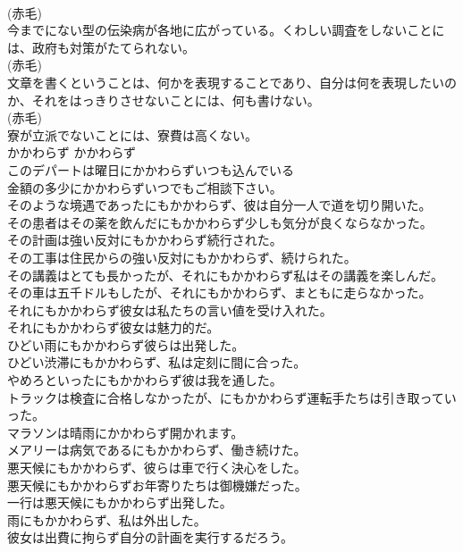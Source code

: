 \documentclass[8pt]{extreport}
\begin{document}
\begin{CJK}{UTF8}{min}
\\	(赤毛)
\\	今までにない型の伝染病が各地に広がっている。くわしい調査をしないことには、政府も対策がたてられない。  
\\	(赤毛)
\\	文章を書くということは、何かを表現することであり、自分は何を表現したいのか、それをはっきりさせないことには、何も書けない。  
\\	(赤毛)
\\	寮が立派でないことには、寮費は高くない。  
\\	かかわらず	かかわらず	
\\	このデパートは曜日にかかわらずいつも込んでいる  
\\	金額の多少にかかわらずいつでもご相談下さい。  
\\	そのような境遇であったにもかかわらず、彼は自分一人で道を切り開いた。   
\\	その患者はその薬を飲んだにもかかわらず少しも気分が良くならなかった。   
\\	その計画は強い反対にもかかわらず続行された。   
\\	その工事は住民からの強い反対にもかかわらず、続けられた。   
\\	その講義はとても長かったが、それにもかかわらず私はその講義を楽しんだ。   
\\	その車は五千ドルもしたが、それにもかかわらず、まともに走らなかった。   
\\	それにもかかわらず彼女は私たちの言い値を受け入れた。   
\\	それにもかかわらず彼女は魅力的だ。   
\\	ひどい雨にもかかわらず彼らは出発した。   
\\	ひどい渋滞にもかかわらず、私は定刻に間に合った。   
\\	やめろといったにもかかわらず彼は我を通した。   
\\	トラックは検査に合格しなかったが、にもかかわらず運転手たちは引き取っていった。   
\\	マラソンは晴雨にかかわらず開かれます。  
\\	メアリーは病気であるにもかかわらず、働き続けた。   
\\	悪天候にもかかわらず、彼らは車で行く決心をした。   
\\	悪天候にもかかわらずお年寄りたちは御機嫌だった。   
\\	一行は悪天候にもかかわらず出発した。   
\\	雨にもかかわらず、私は外出した。   
\\	彼女は出費に拘らず自分の計画を実行するだろう。  

\end{CJK}
\end{document}
